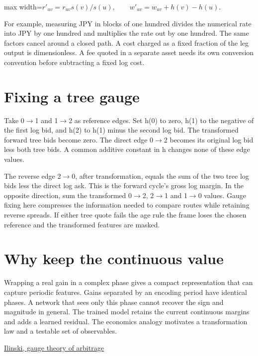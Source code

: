 \documentclass[11pt,oneside,openany]{book}
\begin{document}
\begin{center}\begin{adjustbox}{max width=\linewidth}$\displaystyle r'_{uv}=r_{uv}s(v)/s(u),\qquad w'_{uv}=w_{uv}+h(v)-h(u).$\end{adjustbox}\end{center}
For example, measuring JPY in blocks of one hundred divides the numerical rate into JPY by one hundred and multiplies the rate out by one hundred. The same factors cancel around a closed path. A cost charged as a fixed fraction of the leg output is dimensionless. A fee quoted in a separate asset needs its own conversion convention before subtracting a fixed log cost.

\section*{Fixing a tree gauge}
Take 0\ensuremath{\to}1 and 1\ensuremath{\to}2 as reference edges. Set h(0) to zero, h(1) to the negative of the first log bid, and h(2) to h(1) minus the second log bid. The transformed forward tree bids become zero. The direct edge 0\ensuremath{\to}2 becomes its original log bid less both tree bids. A common additive constant in h changes none of these edge values.

The reverse edge 2\ensuremath{\to}0, after transformation, equals the sum of the two tree log bids less the direct log ask. This is the forward cycle's gross log margin. In the opposite direction, sum the transformed 0\ensuremath{\to}2, 2\ensuremath{\to}1 and 1\ensuremath{\to}0 values. Gauge fixing here compresses the information needed to compare routes while retaining reverse spreads. If either tree quote fails the age rule the frame loses the chosen reference and the transformed features are masked.

\section*{Why keep the continuous value}
Wrapping a real gain in a complex phase gives a compact representation that can capture periodic features. Gains separated by an encoding period have identical phases. A network that sees only this phase cannot recover the sign and magnitude in general. The trained model retains the current continuous margins and adds a learned residual. The economics analogy motivates a transformation law and a testable set of observables.

{\small\sffamily\href{https://doi.org/10.1088/0305-4470/33/1/102}{Ilinski, gauge theory of arbitrage}\par}
\end{document}
